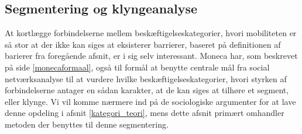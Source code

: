 \subsection{Segmentering og klyngeanalyse \label{segogklynge}}

At kortlægge forbindelserne mellem beskæftigelseskategorier, hvori mobiliteten er så stor at der ikke kan siges at eksisterer barrierer, baseret på definitionen af barierer fra foregående afsnit, er i sig selv interessant. Moneca har, som beskrevet på side \ref{monecaformaal}, også til formål at benytte centrale mål fra social netværksanalyse til at vurdere hvilke beskæftigelseskategorier, hvori styrken af forbindelserne antager en sådan karakter, at de kan siges at tilhøre et segment, eller klynge. Vi vil komme nærmere ind på de sociologiske argumenter for at lave denne opdeling i afsnit \ref{kategori_teori}, mens dette afsnit primært omhandler metoden der benyttes til denne segmentering.

